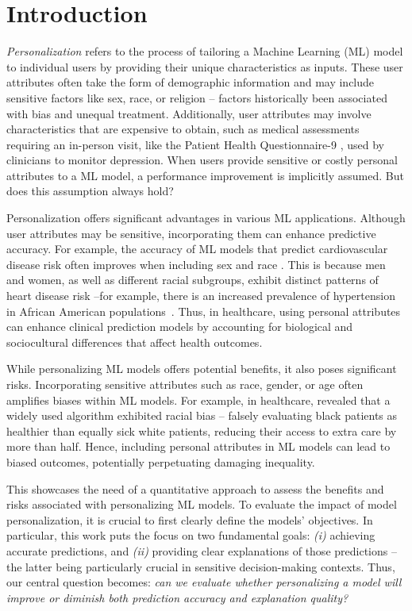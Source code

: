 \section{Introduction}\label{sec:introduction}

\textit{Personalization} refers to the process of tailoring a Machine Learning (ML) model to individual users by providing their unique characteristics as inputs. These user attributes often take the form of demographic information and may include sensitive factors like sex, race, or religion -- factors historically been associated with bias and unequal treatment. Additionally, user attributes may involve characteristics that are expensive to obtain, such as medical assessments requiring an in-person visit, like the Patient Health Questionnaire-9 \citep{kroenke2001phq9}, used by clinicians to monitor depression. When users provide sensitive or costly personal attributes to a ML model, a performance improvement is implicitly assumed. But does this assumption always hold?


Personalization offers significant advantages in various ML applications. Although user attributes may be sensitive, incorporating them can enhance predictive accuracy. For example, the accuracy of ML models that predict cardiovascular disease risk often improves when including sex \citep{womencvd1,womencvd2, womencvd3} and race \citep{racecvd}. This is because men and women, as well as different racial subgroups, exhibit distinct patterns of heart disease risk --for example, there is an increased prevalence of hypertension in African American populations~\citep{flack2003epidemiology}. Thus, in healthcare, using personal attributes can enhance clinical prediction models by accounting for biological and sociocultural differences that affect health outcomes.


While personalizing ML models offers potential benefits, it also poses significant risks. Incorporating sensitive attributes such as race, gender, or age often amplifies biases within ML models. For example, in healthcare, \citet{Obermeyer2019} revealed that a widely used algorithm exhibited racial bias -- falsely evaluating black patients as healthier than equally sick white patients, reducing their access to extra care by more than half. Hence, including personal attributes in ML models can lead to biased outcomes, potentially perpetuating damaging inequality. 


This showcases the need of a quantitative approach to assess the benefits and risks associated with personalizing ML models. To evaluate the impact of model personalization, it is crucial to first clearly define the models' objectives. In particular, this work puts the focus on two fundamental goals: \textit{(i)} achieving accurate predictions, and \textit{(ii)} providing clear explanations of those predictions -- the latter being particularly crucial in sensitive decision-making contexts. 
Thus, our central question becomes: \textit{can we evaluate whether personalizing a model will improve or diminish both prediction accuracy and explanation quality?}

